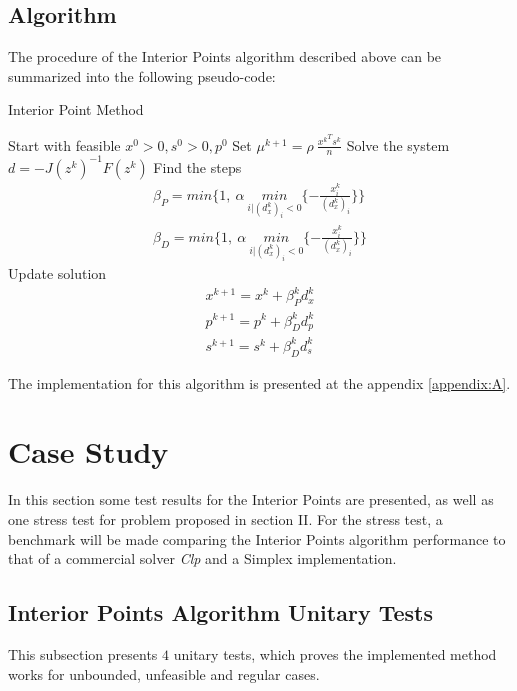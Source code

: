 \documentclass[a4paper]{IEEEtran}
\begin{document}
\subsection{Algorithm}
The procedure of the Interior Points algorithm described above can be summarized into the following pseudo-code:
\begin{algorithm}[H]
\caption{Interior Point Method}\label{euclid}
\begin{algorithmic}[1]
\State Start with feasible $x^0>0,s^0>0,p^0$
	\State Set $\mu^{k+1} = \rho ~ \frac{{x^k}^T{s^k}}{n}$
	\State Solve the system $d = - J(z^k)^{-1}F(z^k) $
	\State Find the steps \begin{align*}
	 \beta_P = min \{1, ~\alpha~ \underset{i|(d^k_x)_i < 0}{min} \{ - \frac{x^k_i}{(d^k_x)_i}\} \} \\
	 \beta_D = min \{1, ~\alpha~ \underset{i|(d^k_x)_i < 0}{min} \{ - \frac{x^k_i}{(d^k_x)_i}\} \}		 
\end{align*}  
	\State Update solution \begin{align*}
	 x^{k+1} = x^k + \beta_P^k d_x^k \\
	 p^{k+1} = p^k + \beta_D^k d_p^k \\ 		 
	 s^{k+1} = s^k + \beta_D^k d_s^k
	\end{align*}  
\EndWhile
\end{algorithmic}
\end{algorithm}
The implementation for this algorithm is presented at the appendix \ref{appendix:A}.

\section{Case Study}
In this section some test results for the Interior Points are presented, as well as one stress test for  problem proposed in section II. For the stress test, a benchmark will be made comparing the Interior Points algorithm performance to that of a commercial solver \emph{Clp} and a Simplex implementation.

\subsection{Interior Points Algorithm Unitary Tests}
This subsection presents $4$ unitary tests, which proves the implemented method works for unbounded, unfeasible and regular cases.
\end{document}
